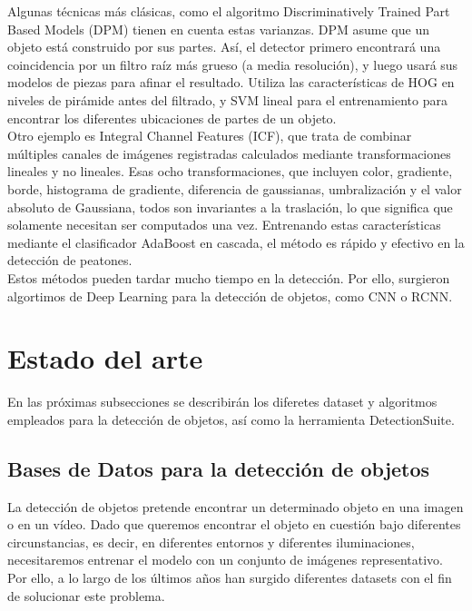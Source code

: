 \documentclass{bmvc2k}
\begin{document}
Algunas técnicas más clásicas, como el algoritmo Discriminatively Trained Part Based Models (DPM) tienen en cuenta estas varianzas. DPM asume que un objeto está construido por sus partes. Así,
el detector primero encontrará una coincidencia por un filtro raíz más grueso (a media resolución), y luego usará sus modelos de piezas para afinar
el resultado. Utiliza las características de HOG en niveles de pirámide antes del filtrado, y SVM lineal para el entrenamiento para encontrar los diferentes
ubicaciones de partes de un objeto.\\

Otro ejemplo es Integral Channel Features (ICF), que trata de combinar múltiples canales de imágenes registradas calculados mediante transformaciones lineales y no lineales. Esas ocho transformaciones, que incluyen color, gradiente, borde, histograma de gradiente, diferencia de gaussianas, umbralización y el valor absoluto de Gaussiana, todos son invariantes a la traslación, lo que significa que solamente necesitan ser computados una vez. Entrenando estas características mediante el clasificador AdaBoost en cascada, el método es rápido y efectivo en la detección de peatones.\\

Estos métodos pueden tardar mucho tiempo en la detección. Por ello, surgieron algortimos de Deep Learning para la detección de objetos, como CNN o RCNN.\\


\section{Estado del arte}

En las próximas subsecciones se describirán los diferetes dataset y algoritmos empleados para la detección de objetos, así como la herramienta DetectionSuite.\\

\subsection{Bases de Datos para la detección de objetos}
La detección de objetos pretende encontrar un determinado objeto en una imagen o en un vídeo. Dado que queremos encontrar el objeto en cuestión bajo diferentes circunstancias, es decir, en diferentes entornos y diferentes iluminaciones, necesitaremos entrenar el modelo con un conjunto de imágenes representativo. Por ello, a lo largo de los últimos años han surgido diferentes datasets con el fin de solucionar este problema.\\
\end{document}
